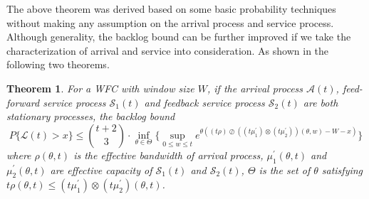 \documentclass[12pt]{article}
\newtheorem{theorem}{Theorem}
\begin{document}
The above theorem was derived based on some basic probability techniques without making any assumption on the arrival process and service process. Although generality, the backlog bound can be further improved if we take the characterization of arrival and service into consideration. As shown in the following two theorems.
\begin{theorem}\label{theorem2}
For a WFC with window size $W$, if the arrival process $\mathcal{A}(t)$, feed-forward service process $\mathcal{S}_1(t)$ and feedback service process $\mathcal{S}_2(t)$ are both stationary processes, the backlog bound
$$P\{\mathcal{L}(t)>x\}\leq {t+2\choose 3}\cdot \inf_{\theta\in\Theta}\{\sup_{0\leq w\leq t}e^{\theta((t\rho)\oslash((t\mu_1^\prime)\otimes(t\mu_2^\prime))(\theta,w)-W-x)}\}$$
where $\rho(\theta,t)$ is the effective bandwidth of arrival process, $\mu_1^\prime(\theta,t)$ and $\mu_2^\prime(\theta,t)$ are effective capacity of $\mathcal{S}_1(t)$ and $\mathcal{S}_2(t)$, $\Theta$ is the set of $\theta$ satisfying $t\rho(\theta,t)\leq (t\mu_1^\prime)\otimes(t\mu_2^\prime)(\theta,t)$.
\end{theorem}
\end{document}
